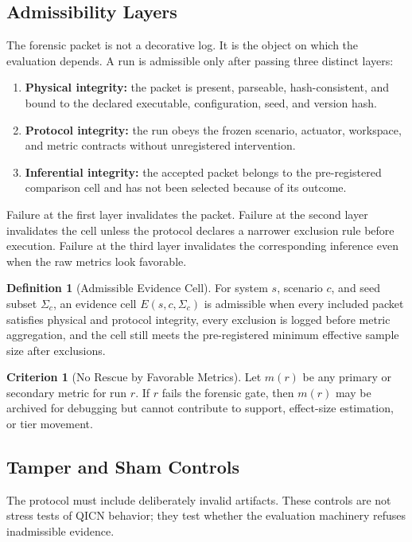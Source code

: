 \documentclass[11pt,a4paper]{article}
\theoremstyle{definition}
\newtheorem{definition}[theorem]{Definition}
\newtheorem{criterion}[theorem]{Criterion}
\begin{document}
\subsection{Admissibility Layers}
The forensic packet is not a decorative log. It is the object on which the evaluation
depends. A run is admissible only after passing three distinct layers:
\begin{enumerate}
\item \textbf{Physical integrity:} the packet is present, parseable, hash-consistent,
and bound to the declared executable, configuration, seed, and version hash.
\item \textbf{Protocol integrity:} the run obeys the frozen scenario, actuator,
workspace, and metric contracts without unregistered intervention.
\item \textbf{Inferential integrity:} the accepted packet belongs to the
pre-registered comparison cell and has not been selected because of its outcome.
\end{enumerate}
Failure at the first layer invalidates the packet. Failure at the second layer
invalidates the cell unless the protocol declares a narrower exclusion rule before
execution. Failure at the third layer invalidates the corresponding inference even
when the raw metrics look favorable.

\begin{definition}[Admissible Evidence Cell]
For system $s$, scenario $c$, and seed subset $\Sigma_c$, an evidence cell
$E(s,c,\Sigma_c)$ is admissible when every included packet satisfies physical and
protocol integrity, every exclusion is logged before metric aggregation, and the
cell still meets the pre-registered minimum effective sample size after exclusions.
\end{definition}

\begin{criterion}[No Rescue by Favorable Metrics]
Let $m(r)$ be any primary or secondary metric for run $r$. If $r$ fails the
forensic gate, then $m(r)$ may be archived for debugging but cannot contribute to
support, effect-size estimation, or tier movement.
\end{criterion}

\subsection{Tamper and Sham Controls}
The protocol must include deliberately invalid artifacts. These controls are not
stress tests of QICN behavior; they test whether the evaluation machinery refuses
inadmissible evidence.
\end{document}
